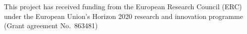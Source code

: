 \documentclass[aps,prb,reprint,noshowkeys,superscriptaddress]{revtex4-1}
\begin{document}


\begin{acknowledgements}
This project has received funding from the European Research Council (ERC) under the European Union's Horizon 2020 research and innovation programme (Grant agreement No.~863481)
\end{acknowledgements}


\end{document}

